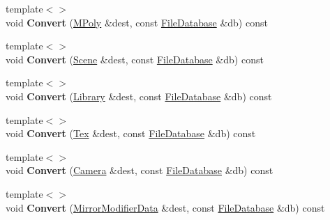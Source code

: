 \begin{DoxyCompactItemize}
\item 
\hypertarget{class_assimp_1_1_blender_1_1_structure_a7fcc584439675dc8faea7630870e32af}{{\footnotesize template$<$$>$ }\\void {\bfseries Convert} (\hyperlink{struct_assimp_1_1_blender_1_1_m_poly}{M\+Poly} \&dest, const \hyperlink{class_assimp_1_1_blender_1_1_file_database}{File\+Database} \&db) const }\label{class_assimp_1_1_blender_1_1_structure_a7fcc584439675dc8faea7630870e32af}

\item 
\hypertarget{class_assimp_1_1_blender_1_1_structure_ac4e62887d11796f451ccbaf175a9c8ac}{{\footnotesize template$<$$>$ }\\void {\bfseries Convert} (\hyperlink{struct_assimp_1_1_blender_1_1_scene}{Scene} \&dest, const \hyperlink{class_assimp_1_1_blender_1_1_file_database}{File\+Database} \&db) const }\label{class_assimp_1_1_blender_1_1_structure_ac4e62887d11796f451ccbaf175a9c8ac}

\item 
\hypertarget{class_assimp_1_1_blender_1_1_structure_a76e1755c00db79158c1e38d2c8d71e2b}{{\footnotesize template$<$$>$ }\\void {\bfseries Convert} (\hyperlink{struct_assimp_1_1_blender_1_1_library}{Library} \&dest, const \hyperlink{class_assimp_1_1_blender_1_1_file_database}{File\+Database} \&db) const }\label{class_assimp_1_1_blender_1_1_structure_a76e1755c00db79158c1e38d2c8d71e2b}

\item 
\hypertarget{class_assimp_1_1_blender_1_1_structure_abe2812371402e56e8330761665f6b89f}{{\footnotesize template$<$$>$ }\\void {\bfseries Convert} (\hyperlink{struct_assimp_1_1_blender_1_1_tex}{Tex} \&dest, const \hyperlink{class_assimp_1_1_blender_1_1_file_database}{File\+Database} \&db) const }\label{class_assimp_1_1_blender_1_1_structure_abe2812371402e56e8330761665f6b89f}

\item 
\hypertarget{class_assimp_1_1_blender_1_1_structure_a2ab2e7f2fb929651cf7b401a9ee9319e}{{\footnotesize template$<$$>$ }\\void {\bfseries Convert} (\hyperlink{struct_assimp_1_1_blender_1_1_camera}{Camera} \&dest, const \hyperlink{class_assimp_1_1_blender_1_1_file_database}{File\+Database} \&db) const }\label{class_assimp_1_1_blender_1_1_structure_a2ab2e7f2fb929651cf7b401a9ee9319e}

\item 
\hypertarget{class_assimp_1_1_blender_1_1_structure_aac710eb07a490ddcf70aef2882840129}{{\footnotesize template$<$$>$ }\\void {\bfseries Convert} (\hyperlink{struct_assimp_1_1_blender_1_1_mirror_modifier_data}{Mirror\+Modifier\+Data} \&dest, const \hyperlink{class_assimp_1_1_blender_1_1_file_database}{File\+Database} \&db) const }\label{class_assimp_1_1_blender_1_1_structure_aac710eb07a490ddcf70aef2882840129}


\end{DoxyCompactItemize}
